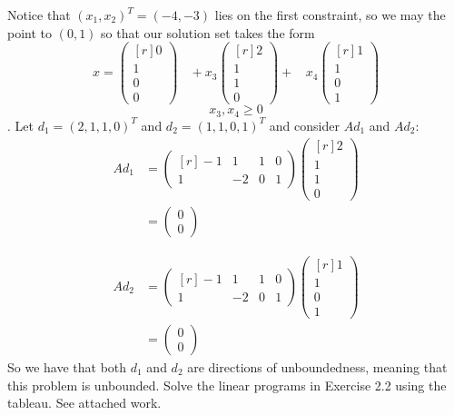 \documentclass{article}
\begin{document}
Notice that $(x_1,x_2)^T = (-4,-3)$ lies on the first constraint, so we may  the point to $(0,1)$ so that our solution set takes the form 
\[x = \begin{pmatrix*}[r]
    0\\
    1\\
    0\\
    0
\end{pmatrix*}
\:\:\:\: + 
x_3\begin{pmatrix*}[r]
   2\\
   1\\
   1\\
   0
\end{pmatrix*}
+ \:\:\:\:
x_4\begin{pmatrix*}[r]
    1\\
    1\\
    0\\
    1
\end{pmatrix*}\]
\[x_3,x_4 \geq 0\]. Let $d_1 = (2, 1, 1, 0)^T$ and $d_2 = (1, 1, 0, 1)^T$ and consider $Ad_1$ and $Ad_2$:
\begin{align*}
    Ad_1 &= \begin{pmatrix*}[r]
        -1 & 1 & 1 & 0\\
        1 & -2 & 0 & 1
    \end{pmatrix*}
    \begin{pmatrix*}[r]
        2\\
        1\\
        1\\
        0
    \end{pmatrix*}\\
    &= 
    \begin{pmatrix*}
        0\\
        0
    \end{pmatrix*}
\end{align*}

\begin{align*}
    Ad_2 &= \begin{pmatrix*}[r]
        -1 & 1 & 1 & 0\\
        1 & -2 & 0 & 1
    \end{pmatrix*}
    \begin{pmatrix*}[r]
        1\\
        1\\
        0\\
        1
    \end{pmatrix*}\\
    &= \begin{pmatrix}
        0\\
        0
    \end{pmatrix}
\end{align*}
So we have that both $d_1$ and $d_2$ are directions of unboundedness, meaning that this problem is unbounded.
\newline\newline\newline
{} Solve the linear programs in Exercise 2.2 using the tableau.
\newline\newline
See attached work.
\end{document}
